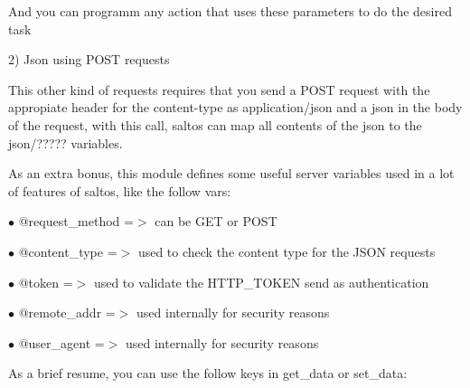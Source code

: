 \documentclass[a4paper]{article}
\begin{document}
And you can programm any action that uses these parameters to do the desired task

2) Json using POST requests

This other kind of requests requires that you send a POST request with the appropiate header
for the content-type as application/json and a json in the body of the request, with this
call, saltos can map all contents of the json to the json/????? variables.

As an extra bonus, this module defines some useful server variables used in a lot of
features of saltos, like the follow vars:

\begin{compactitem}
\item[\color{myblue}$\bullet$] @request\_method =$>$ can be GET or POST
\item[\color{myblue}$\bullet$] @content\_type   =$>$ used to check the content type for the JSON requests
\item[\color{myblue}$\bullet$] @token          =$>$ used to validate the HTTP\_TOKEN send as authentication
\item[\color{myblue}$\bullet$] @remote\_addr    =$>$ used internally for security reasons
\item[\color{myblue}$\bullet$] @user\_agent     =$>$ used internally for security reasons
\end{compactitem}

As a brief resume, you can use the follow keys in get\_data or set\_data:
\end{document}
